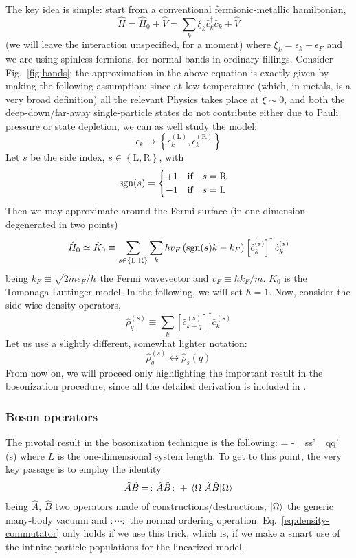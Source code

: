 The key idea is simple: start from a conventional fermionic-metallic hamiltonian,
\[
	\hat H = \hat H_0 + \hat V = \sum_k \xi_k \hat c_k^\dagger \hat c_k + \hat V
\]
(we will leave the interaction unspecified, for a moment) where $\xi_k = \epsilon_k - \epsilon_F$ and we are using spinless fermions, for normal bands in ordinary fillings.
Consider Fig.~\ref{fig:bands}: the approximation in the above equation is exactly given by making the following assumption: since at low temperature (which, in metals, is a very broad definition) all the relevant Physics takes place at $\xi \sim 0$, and both the deep-down/far-away single-particle states do not contribute either due to Pauli pressure or state depletion, we can as well study the model:
\[
	\epsilon_k \to \left\{\epsilon_k^{(\mathrm L)}, \epsilon_k^{(\mathrm R)} \right\}
\]
Let $s$ be the side index, $s \in \left\{\mathrm L, \mathrm R\right\}$, with
\[
\mathrm{sgn}(s) = \begin{cases}
	+1 \quad \text{if} \quad s = \mathrm R \\
	-1 \quad \text{if} \quad s = \mathrm L
\end{cases}
\]
Then we may approximate around the Fermi surface (in one dimension degenerated in two points)
\[
	\hat H_0 \simeq \hat K_0 \equiv \sum_{s \in \left\{\mathrm L, \mathrm R\right\}} \sum_k \hbar v_F \left( \mathrm{sgn}(s) k -  k_F \right) \left[ \hat c_k^{(s)} \right]^\dagger \hat c_k^{(s)}
\]
being $k_F \equiv \sqrt{2m\epsilon_F/\hbar}$ the Fermi wavevector and $v_F \equiv \hbar k_F / m$. $\hat K_0$ is the Tomonaga-Luttinger model. In the following, we will set $\hbar=1$. Now, consider the side-wise density operators,
\[
	\hat \rho_q^{(s)} \equiv \sum_k  \left[ \hat c_{k+q}^{(s)} \right]^\dagger \hat c_k^{(s)}
\]
Let us use a slightly different, somewhat lighter notation:
\[
	\hat \rho_q^{(s)} \leftrightarrow \hat \rho_s (q)
\]
From now on, we will proceed only highlighting the important result in the bosonization procedure, since all the detailed derivation is included in \cite{giamarchi2003quantum}.

\subsubsection{Boson operators}

The pivotal result in the bosonization technique is the following:
\beq\label{eq:density-commutator}
	 = - \delta_{ss'} \delta_{qq'} \sgn(s) 
\eeq
where $L$ is the one-dimensional system length.
To get to this point, the very key passage is to employ the identity
\[
	\hat A \hat B = \colon \hat A \hat B \colon + \mel{\Omega}{\hat A \hat B}{\Omega}
\]
being $\hat A$, $\hat B$ two operators made of constructions/destructions, $\ket{\Omega}$ the generic many-body vacuum and $\colon \cdots \colon$ the normal ordering operation. Eq.~\eqref{eq:density-commutator} only holds if we use this trick, which is, if we make a smart use of the infinite particle populations for the linearized model.

